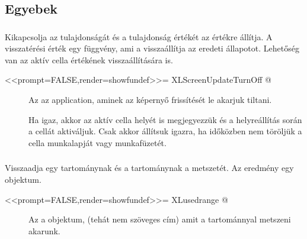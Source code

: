 \subsection{Egyebek}
\subsubsection{}

Kikapcsolja az   tulajdonságát és a
 tulajdonság értékét az  
értékre állítja. A visszatérési érték egy függvény, ami a
visszaállítja az eredeti állapotot. Lehetőség 
van az aktív cella értékének visszaállítására is.
\begin{Rnw}
<<prompt=FALSE,render=showfundef>>=
XLScreenUpdateTurnOff
@
\end{Rnw}
\begin{description}
\item[] Az az  application, aminek az képernyő
  frissítését le akarjuk tiltani. 
\item[] Ha igaz, akkor az aktív cella helyét is
  megjegyezzük és a helyreállítás során a cellát aktiváljuk. Csak
  akkor állítsuk igazra, ha időközben nem töröljük a cella munkalapját
  vagy munkafüzetét. 
\end{description}

\subsubsection{}

Visszaadja egy tartománynak és a  tartománynak a
metszetét. Az eredmény egy  objektum.
\begin{Rnw}
<<prompt=FALSE,render=showfundef>>=
XLusedrange
@
\end{Rnw}
\begin{description}
\item[] Az a  objektum, (tehát nem szöveges cím)
  amit a  tartománnyal metszeni akarunk.
\end{description}

